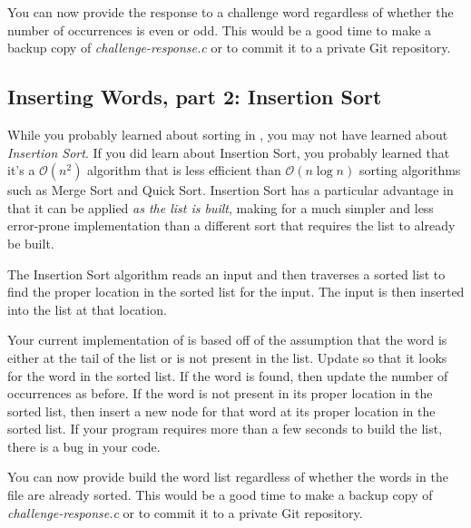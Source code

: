 You can now provide the response to a challenge word regardless of whether the number of occurrences is even or odd.
This would be a good time to make a backup copy of \textit{challenge-response.c} or to commit it to a private Git repository.

\subsection{Inserting Words, part 2: Insertion Sort}\label{subsec:insertionsort}

While you probably learned about sorting in \cstwo, you may not have learned about \textit{Insertion Sort}.
If you did learn about Insertion Sort, you probably learned that it's a $\mathcal{O}(n^2)$ algorithm that is less efficient than $\mathcal{O}(n \log n)$ sorting algorithms such as Merge Sort and Quick Sort.
Insertion Sort has a particular advantage in that it can be applied \textit{as the list is built}, making for a much simpler and less error-prone implementation than a different sort that requires the list to already be built.

The Insertion Sort algorithm reads an input and then traverses a sorted list to find the proper location in the sorted list for the input.
The input is then inserted into the list at that location.

Your current implementation of  is based off of the assumption that the word is either at the tail of the list or is not present in the list.
Update  so that it looks for the word in the sorted list.
If the word is found, then update the number of occurrences as before.
If the word is not present in its proper location in the sorted list, then insert a new node for that word at its proper location in the sorted list.
If your program requires more than a few seconds to build the list, there is a bug in your code.

You can now provide build the word list regardless of whether the words in the file are already sorted.
This would be a good time to make a backup copy of \textit{challenge-response.c} or to commit it to a private Git repository.
